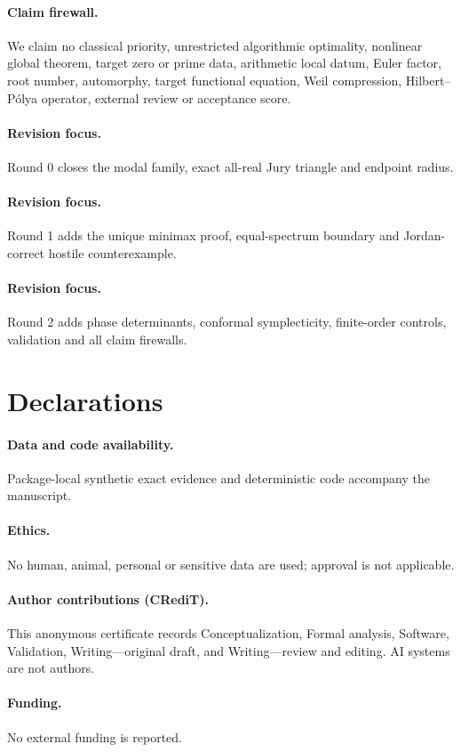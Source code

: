 \documentclass[9pt]{extarticle}
\begin{document}
\paragraph{Claim firewall.}
We claim no classical priority, unrestricted algorithmic optimality,
nonlinear global theorem, target zero or prime data, arithmetic local datum,
Euler factor, root number, automorphy, target functional equation, Weil
compression, Hilbert--P\'olya operator, external review or acceptance score.
\fi

\ifcase\CRevisionRound
\paragraph{Revision focus.} Round 0 closes the modal family, exact all-real
Jury triangle and endpoint radius.
\or
\paragraph{Revision focus.} Round 1 adds the unique minimax proof, equal-spectrum
boundary and Jordan-correct hostile counterexample.
\or
\paragraph{Revision focus.} Round 2 adds phase determinants, conformal
symplecticity, finite-order controls, validation and all claim firewalls.
\fi

\section*{Declarations}
\paragraph{Data and code availability.} Package-local synthetic exact evidence
and deterministic code accompany the manuscript.
\paragraph{Ethics.} No human, animal, personal or sensitive data are used;
approval is not applicable.
\paragraph{Author contributions (CRediT).} This anonymous certificate records
Conceptualization, Formal analysis, Software, Validation, Writing---original
draft, and Writing---review and editing.  AI systems are not authors.
\paragraph{Funding.} No external funding is reported.
\end{document}
